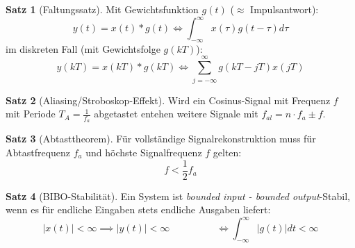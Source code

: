 \documentclass[a4paper, 11pt]{scrartcl}
\theoremstyle{definition}
\newtheorem{theorem}{Satz}
\begin{document}
\begin{theorem}[Faltungssatz]
    Mit Gewichtsfunktion $g(t)$ ($\approx$ Impulsantwort):
        \[y(t)=x(t)*g(t)\Leftrightarrow\int_{-\infty}^{\infty}x(\tau)g(t-\tau)d\tau\]
    im diskreten Fall (mit Gewichtsfolge $g(kT)$):
        \[y(kT)=x(kT)*g(kT)\Leftrightarrow\sum_{j=-\infty}^\infty g(kT-jT)x(jT)\]
\end{theorem}
\begin{theorem}[Aliasing/Stroboskop-Effekt]
    Wird ein Cosinus-Signal mit Frequenz $f$ mit Periode $T_A = \frac{1}{f_a}$ abgetastet entehen weitere Signale mit $f_{al}=n\cdot f_a\pm f$.
\end{theorem}
\begin{theorem}[Abtasttheorem]
    Für vollständige Signalrekonstruktion muss für Abtastfrequenz $f_a$ und höchste Signalfrequenz $f$ gelten:
    \[f<\frac{1}{2}f_a\]
\end{theorem}
\begin{theorem}[BIBO-Stabilität]
    Ein System ist \emph{bounded input - bounded output}-Stabil, wenn es für endliche Eingaben stets endliche Ausgaben liefert:
    \[|x(t)|<\infty\implies|y(t)|<\infty \hspace{2cm}\Leftrightarrow \int_{-\infty}^\infty|g(t)|dt<\infty\]
\end{theorem}
\end{document}

